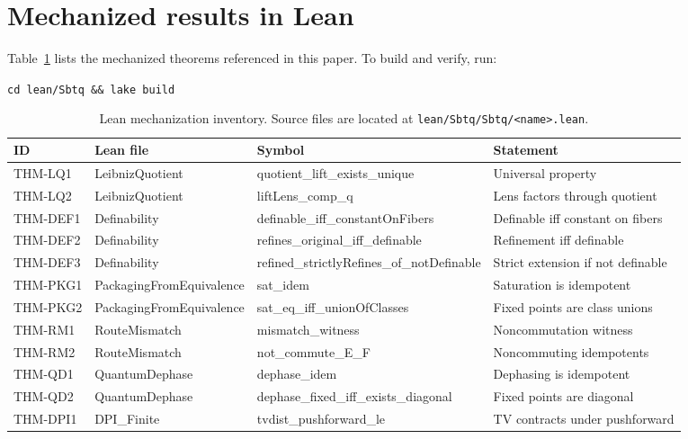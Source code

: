 \section{Mechanized results in Lean}\label{app:lean}

Table~\ref{tab:lean-inventory} lists the mechanized theorems referenced in this paper. To build and verify, run:

\medskip
\noindent\texttt{cd lean/Sbtq \&\& lake build}

\begin{table}[t]
  \centering
  \scriptsize
  \setlength{\tabcolsep}{4pt}
  \begin{tabular}{@{}llll@{}}
    \toprule
    ID & Lean file & Symbol & Statement \\
    \midrule
    THM-LQ1 & LeibnizQuotient & quotient\_lift\_exists\_unique & Universal property \\
    THM-LQ2 & LeibnizQuotient & liftLens\_comp\_q & Lens factors through quotient \\
    THM-DEF1 & Definability & definable\_iff\_constantOnFibers & Definable iff constant on fibers \\
    THM-DEF2 & Definability & refines\_original\_iff\_definable & Refinement iff definable \\
    THM-DEF3 & Definability & refined\_strictlyRefines\_of\_notDefinable & Strict extension if not definable \\
    THM-PKG1 & PackagingFromEquivalence & sat\_idem & Saturation is idempotent \\
    THM-PKG2 & PackagingFromEquivalence & sat\_eq\_iff\_unionOfClasses & Fixed points are class unions \\
    THM-RM1 & RouteMismatch & mismatch\_witness & Noncommutation witness \\
    THM-RM2 & RouteMismatch & not\_commute\_E\_F & Noncommuting idempotents \\
    THM-QD1 & QuantumDephase & dephase\_idem & Dephasing is idempotent \\
    THM-QD2 & QuantumDephase & dephase\_fixed\_iff\_exists\_diagonal & Fixed points are diagonal \\
    THM-DPI1 & DPI\_Finite & tvdist\_pushforward\_le & TV contracts under pushforward \\
    \bottomrule
  \end{tabular}
  \caption{Lean mechanization inventory. Source files are located at \texttt{lean/Sbtq/Sbtq/<name>.lean}.}
  \label{tab:lean-inventory}
\end{table}
